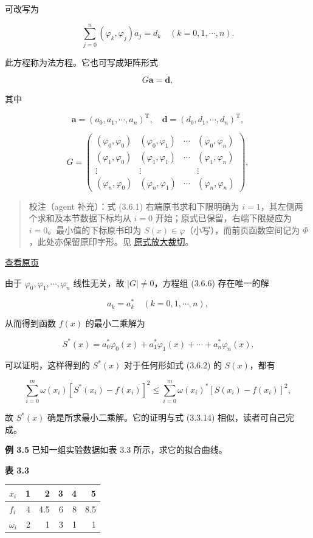 \documentclass[
  10pt,
  fontset=fandol]{ctexart}
\newcounter{none} %
\begin{document}
可改写为

\[
\sum_{j=0}^n(\varphi_k,\varphi_j)a_j=d_k\quad(k=0,1,\cdots,n).\tag{3.6.6}
\]

此方程称为法方程。它也可写成矩阵形式

\[
G\boldsymbol a=\boldsymbol d,
\]

其中

\[
\boldsymbol a=(a_0,a_1,\cdots,a_n)^{\mathrm T},\quad\boldsymbol d=(d_0,d_1,\cdots,d_n)^{\mathrm T},
\]

\[
G=\begin{pmatrix}
(\varphi_0,\varphi_0)&(\varphi_0,\varphi_1)&\cdots&(\varphi_0,\varphi_n)\\
(\varphi_1,\varphi_0)&(\varphi_1,\varphi_1)&\cdots&(\varphi_1,\varphi_n)\\
\vdots&\vdots&&\vdots\\
(\varphi_n,\varphi_0)&(\varphi_n,\varphi_1)&\cdots&(\varphi_n,\varphi_n)
\end{pmatrix},\tag{3.6.7}
\]

\begin{quote}
校注（agent 补充）：式 (3.6.1) 右端原书求和下限明确为 \(i=1\)，其左侧两个求和及本节数据下标均从 \(i=0\) 开始；原式已保留，右端下限疑应为 \(i=0\)。最小值的下标原书印为 \(S(x)\in\varphi\)（小写），而前页函数空间记为 \(\Phi\)，此处亦保留原印字形。见 \href{../assets/ch03b/p079-minimum-formula.png}{原式放大裁切}。
\end{quote}

\href{../../source-images/pdf-080.jpeg}{查看原页}

由于 \(\varphi_0,\varphi_1,\cdots,\varphi_n\) 线性无关，故 \(|G|\ne0\)，方程组 (3.6.6) 存在唯一的解

\[
a_k=a_k^*\quad(k=0,1,\cdots,n),
\]

从而得到函数 \(f(x)\) 的最小二乘解为

\[
S^*(x)=a_0^*\varphi_0(x)+a_1^*\varphi_1(x)+\cdots+a_n^*\varphi_n(x).
\]

可以证明，这样得到的 \(S^*(x)\) 对于任何形如式 (3.6.2) 的 \(S(x)\)，都有

\[
\sum_{i=0}^m\omega(x_i)[S^*(x_i)-f(x_i)]^2\leqslant\sum_{i=0}^m\omega(x_i)^*[S(x_i)-f(x_i)]^2,
\]

故 \(S^*(x)\) 确是所求最小二乘解。它的证明与式 (3.3.14) 相似，读者可自己完成。

\textbf{例 3.5} 已知一组实验数据如表 3.3 所示，求它的拟合曲线。

\textbf{表 3.3}

{\def\LTcaptype{none} %
\begin{longtable}[]{@{}lrrrrr@{}}
\toprule\noalign{}
\(x_i\) & 1 & 2 & 3 & 4 & 5 \\
\midrule\noalign{}
\endhead
\bottomrule\noalign{}
\endlastfoot
\(f_i\) & 4 & 4.5 & 6 & 8 & 8.5 \\
\(\omega_i\) & 2 & 1 & 3 & 1 & 1 \\
\end{longtable}
}
\end{document}
